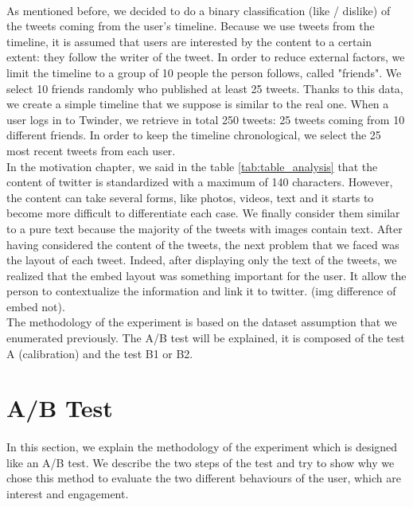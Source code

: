 \paragraph{}
As mentioned before, we decided to do a binary classification (like / dislike) of the tweets coming from the user's timeline. Because we use tweets from the timeline, it is assumed that users are interested by the content to a certain extent: they follow the writer of the tweet. In order to reduce external factors, we limit the timeline to a group of 10 people the person follows, called "friends". We select 10 friends randomly who published at least 25 tweets. Thanks to this data, we create a simple timeline that we suppose is similar to the real one. When a user logs in to Twinder, we retrieve in total 250 tweets: 25 tweets coming from 10 different friends. In order to keep the timeline chronological, we select the 25 most recent tweets from each user. \\
In the motivation chapter, we said in the table \ref{tab:table_analysis} that the content of twitter is standardized with a maximum of 140 characters. However, the content can take several forms, like photos, videos, text and it starts to become more difficult to differentiate each case. We finally consider them similar to a pure text because the majority of the tweets with images contain text. After having considered the content of the tweets, the next problem that we faced was the layout of each tweet. Indeed, after displaying only the text of the tweets, we realized that the embed layout was something important for the user. It allow the person to contextualize the information and link it to twitter. (img difference of embed not). \\
The methodology of the experiment is based on the dataset assumption that we enumerated previously. The A/B test will be explained, it is composed of the test A (calibration) and the test B1 or B2.  

\section{A/B Test}

\paragraph{}
In this section, we explain the methodology of the experiment which is designed like an A/B test. We describe the two steps of the test and try to show why we chose this method to evaluate the two different behaviours of the user, which are interest and engagement.

